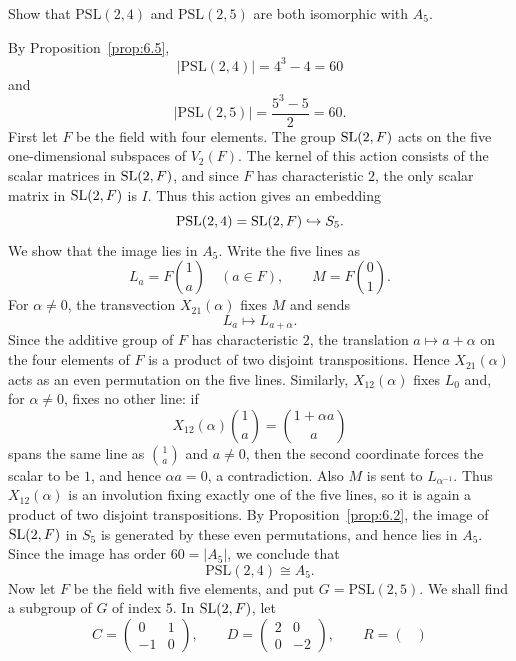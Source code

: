\documentclass[../Odyssey_Project.tex]{subfiles}
\begin{document}
\begin{exercise}
\label{ex:6.3}
Show that $\mathrm{PSL}(2,4)$ and $\mathrm{PSL}(2,5)$ are both isomorphic with $A_5$.
\end{exercise}
\begin{solution}
By Proposition~\ref{prop:6.5},
\[
    \lvert \mathrm{PSL}(2,4)\rvert=4^3-4=60
\]
and
\[
    \lvert \mathrm{PSL}(2,5)\rvert=\frac{5^3-5}{2}=60.
\]
First let $F$ be the field with four elements. The group $\operatorname{SL}(2,F)$ acts on the five one-dimensional subspaces of $V_2(F)$. The kernel of this action consists of the scalar matrices in $\operatorname{SL}(2,F)$, and since $F$ has characteristic $2$, the only scalar matrix in $\operatorname{SL}(2,F)$ is $I$. Thus this action gives an embedding
\[
    \mathrm{PSL}(2,4)=\operatorname{SL}(2,F)\hookrightarrow S_5.
\]
We show that the image lies in $A_5$. Write the five lines as
\[
    L_a=F\binom{1}{a}\quad(a\in F),
    \qquad
    M=F\binom{0}{1}.
\]
For $\alpha\neq0$, the transvection $X_{21}(\alpha)$ fixes $M$ and sends
\[
    L_a\mapsto L_{a+\alpha}.
\]
Since the additive group of $F$ has characteristic $2$, the translation $a\mapsto a+\alpha$ on the four elements of $F$ is a product of two disjoint transpositions. Hence $X_{21}(\alpha)$ acts as an even permutation on the five lines. Similarly, $X_{12}(\alpha)$ fixes $L_0$ and, for $\alpha\neq0$, fixes no other line: if
\[
    X_{12}(\alpha)\binom{1}{a}
    =
    \binom{1+\alpha a}{a}
\]
spans the same line as $\binom{1}{a}$ and $a\neq0$, then the second coordinate forces the scalar to be $1$, and hence $\alpha a=0$, a contradiction. Also $M$ is sent to $L_{\alpha^{-1}}$. Thus $X_{12}(\alpha)$ is an involution fixing exactly one of the five lines, so it is again a product of two disjoint transpositions. By Proposition~\ref{prop:6.2}, the image of $\operatorname{SL}(2,F)$ in $S_5$ is generated by these even permutations, and hence lies in $A_5$. Since the image has order $60=\lvert A_5\rvert$, we conclude that
\[
    \mathrm{PSL}(2,4)\cong A_5.
\]
Now let $F$ be the field with five elements, and put $G=\mathrm{PSL}(2,5)$. We shall find a subgroup of $G$ of index $5$. In $\operatorname{SL}(2,F)$, let
\[
    C=
    \begin{pmatrix}
        0  & 1\\
        -1 & 0
    \end{pmatrix},
    \qquad
    D=
    \begin{pmatrix}
        2 & 0\\
        0 & -2
    \end{pmatrix},
    \qquad
    R=
    \begin{pmatrix}

\end{pmatrix}\]
\end{solution}
\end{document}
